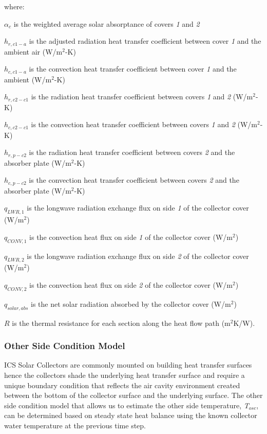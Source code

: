 where:

\(\alpha_{c}\) is the weighted average solar absorptance of covers \emph{1} and \emph{2}

\(h_{r,c1-a}\) is the adjusted radiation heat transfer coefficient between cover \emph{1} and the ambient air (W/m\(^{2}\)-K)

\(h_{c,c1-a}\) is the convection heat transfer coefficient between cover \emph{1} and the ambient (W/m\(^{2}\)-K)

\(h_{r,c2-c1}\) is the radiation heat transfer coefficient between covers \emph{1} and \emph{2} (W/m\(^{2}\)-K)

\(h_{c,c2-c1}\) is the convection heat transfer coefficient between covers \emph{1} and \emph{2} (W/m\(^{2}\)-K)

\(h_{r,p-c2}\) is the radiation heat transfer coefficient between covers \emph{2} and the absorber plate (W/m\(^{2}\)-K)

\(h_{c,p-c2}\) is the convection heat transfer coefficient between covers \emph{2} and the absorber plate (W/m\(^{2}\)-K)

\(q_{LWR,1}\) is the longwave radiation exchange flux on side \emph{1} of the collector cover (W/m\(^{2}\))

\(q_{CONV,1}\) is the convection heat flux on side \emph{1} of the collector cover (W/m\(^{2}\))

\(q_{LWR,2}\) is the longwave radiation exchange flux on side \emph{2} of the collector cover (W/m\(^{2}\))

\(q_{CONV,2}\) is the convection heat flux on side \emph{2} of the collector cover (W/m\(^{2}\))

\(q_{solar,abs}\) is the net solar radiation absorbed by the collector cover (W/m\(^{2}\))

\(R\) is the thermal resistance for each section along the heat flow path (m\(^{2}\)K/W).

\subsubsection{Other Side Condition Model}\label{other-side-condition-model}

ICS Solar Collectors are commonly mounted on building heat transfer surfaces hence the collectors shade the underlying heat transfer surface and require a unique boundary condition that reflects the air cavity environment created between the bottom of the collector surface and the underlying surface. The other side condition model that allows us to estimate the other side temperature, \emph{T\(_{osc}\)}, can be determined based on steady state heat balance using the known collector water temperature at the previous time step.

